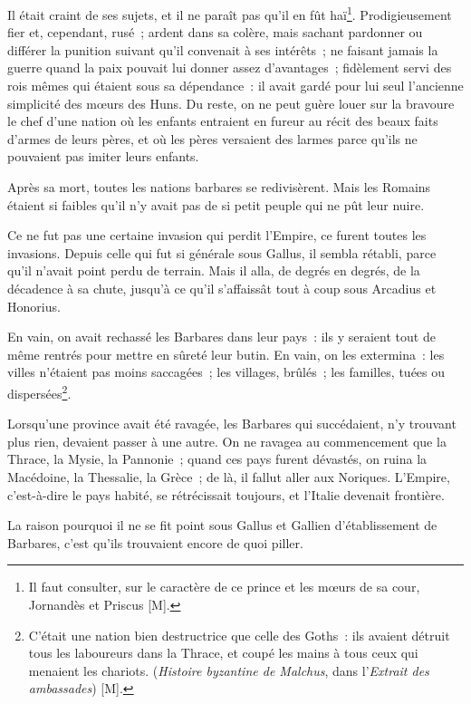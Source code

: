 \documentclass[french,twoside]{book} %
\begin{document}
Il était craint de ses sujets, et il ne paraît pas qu’il en fût haï\footnote{Il faut consulter, sur le caractère de ce prince et les mœurs de sa cour, Jornandès et Priscus [M].}. Prodigieusement fier et, cependant, rusé ; ardent dans sa colère, mais sachant pardonner ou différer la punition suivant qu’il convenait à ses intérêts ; ne faisant jamais la guerre quand la paix pouvait lui donner assez d’avantages ; fidèlement servi des rois mêmes qui étaient sous sa dépendance : il avait gardé pour lui seul l’ancienne simplicité des mœurs des Huns. Du reste, on ne peut guère louer sur la bravoure le chef d’une nation où les enfants entraient en fureur au récit des beaux faits d’armes de leurs pères, et où les pères versaient des larmes parce qu’ils ne pouvaient pas imiter leurs enfants.\par
Après sa mort, toutes les nations barbares se redivisèrent. Mais les Romains étaient si faibles qu’il n’y avait pas de si petit peuple qui ne pût leur nuire.\par
Ce ne fut pas une certaine invasion qui perdit l’Empire, ce furent toutes les invasions. Depuis celle qui fut si générale sous Gallus, il sembla rétabli, parce qu’il n’avait point perdu de terrain. Mais il alla, de degrés en degrés, de la décadence à sa chute, jusqu’à ce qu’il s’affaissât tout à coup sous Arcadius et Honorius.\par
En vain, on avait rechassé les Barbares dans leur pays : ils y seraient tout de même rentrés pour mettre en sûreté leur butin. En vain, on les extermina : les villes n’étaient pas moins saccagées ; les villages, brûlés ; les familles, tuées ou dispersées\footnote{C’était une nation bien destructrice que celle des Goths : ils avaient détruit tous les laboureurs dans la Thrace, et coupé les mains à tous ceux qui menaient les chariots. ({\itshape Histoire byzantine de Malchus}, dans l’{\itshape Extrait des ambassades}) [M].}.\par
Lorsqu’une province avait été ravagée, les Barbares qui succédaient, n’y trouvant plus rien, devaient passer à une autre. On ne ravagea au commencement que la Thrace, la Mysie, la Pannonie ; quand ces pays furent dévastés, on ruina la Macédoine, la Thessalie, la Grèce ; de là, il fallut aller aux Noriques. L’Empire, c’est-à-dire le pays habité, se rétrécissait toujours, et l’Italie devenait frontière.\par
La raison pourquoi il ne se fit point sous Gallus et Gallien d’établissement de Barbares, c’est qu’ils trouvaient encore de quoi piller.\par
\end{document}

